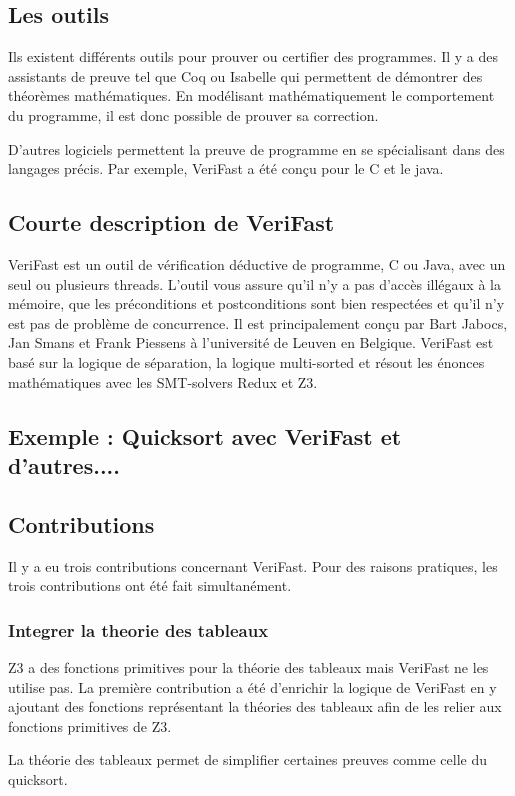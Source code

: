 \documentclass[9pt]{book}
\newcommand{\verifast}{VeriFast}
\begin{document}
		\subsection{Les outils}
		Ils existent diff\'erents outils pour prouver ou certifier des programmes. Il y a des assistants de preuve tel que Coq ou Isabelle qui permettent de d\'emontrer des th\'eor\`emes math\'ematiques. En mod\'elisant math\'ematiquement le comportement du programme, il est donc possible de prouver sa correction. \par
	D'autres logiciels permettent la preuve de programme en se sp\'ecialisant dans des langages pr\'ecis. Par exemple, \verifast{} a \'et\'e con\c{c}u pour le C et le java.
		\subsection{Courte description de \verifast{}}
			\verifast{} est un outil de v\'erification d\'eductive de programme, C ou Java, avec un seul ou plusieurs threads. L'outil vous assure qu'il n'y a pas d'acc\`es ill\'egaux \`a la m\'emoire, que les pr\'econditions et postconditions sont bien respect\'ees et qu'il n'y est pas de probl\`eme de concurrence. Il est principalement con\c{c}u par Bart Jabocs, Jan Smans et Frank Piessens \`a l'universit\'e de Leuven en Belgique. \verifast{} est bas\'e sur la logique de s\'eparation, la logique multi-sorted et r\'esout les \'enonces math\'ematiques avec les SMT-solvers Redux et Z3.
		\subsection{Exemple : Quicksort avec \verifast{} et d'autres....}
		\subsection{Contributions}
		Il y a eu trois contributions concernant \verifast{}. Pour des raisons pratiques, les trois contributions ont \'et\'e fait simultan\'ement.
			\subsubsection{Integrer la theorie des tableaux}
				Z3 a des fonctions primitives pour la th\'eorie des tableaux mais \verifast{} ne les utilise pas. La premi\`ere contribution a \'et\'e d'enrichir la logique de \verifast{} en y ajoutant des fonctions repr\'esentant la th\'eories des tableaux afin de les relier aux fonctions primitives de Z3. \par
				La th\'eorie des tableaux permet de simplifier certaines preuves comme celle du quicksort.
\end{document}
